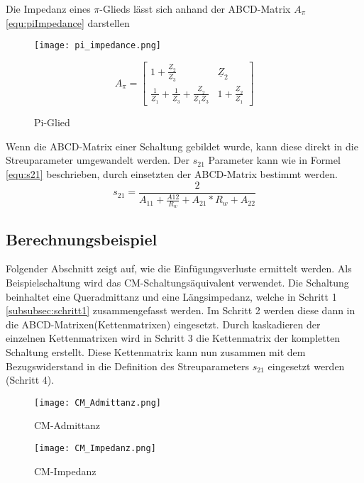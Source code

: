 Die Impedanz eines  $\pi$-Glieds lässt sich anhand der ABCD-Matrix $A_\pi$   \ref{equ:piImpedance} darstellen
\begin{figure}[H]
	\begin{minipage}[h]{0.45\linewidth}
		\centering
		\texttt{[image: pi\_impedance.png]}
		\label{fig:piImpedance}
		\caption{Pi-Glied}
	\end{minipage}
	\begin{minipage}[h]{0.45\linewidth}
		\begin{equation}\label{equ:piImpedance}
			A_\pi = \left[\begin{matrix}
			1+\frac{\underline{Z}_2}{\underline{Z}_3}&\underline{Z}_2\\
			\frac{1}{\underline{Z}_1}+\frac{1}{\underline{Z}_3}+\frac{\underline{Z}_2}{\underline{Z}_1\underline{Z}_3}&1+\frac{\underline{Z}_2}				{\underline{Z}_1}
			\end{matrix}\right]
		\end{equation}
	\end{minipage}
\end{figure}

Wenn die ABCD-Matrix einer Schaltung gebildet wurde, kann diese direkt in die Streuparameter umgewandelt werden. Der $s_{21}$ Parameter kann wie in Formel \ref{equ:s21} beschrieben, durch einsetzten der ABCD-Matrix bestimmt werden.
\begin{equation}\label{equ:s21}
s_{21} = \frac{2}{A_{11}+\frac{A{12}}{R_w}+A_{21}*R_w+A_{22}}
\end{equation}
\newpage

\subsection{Berechnungsbeispiel} \label{subsec:beispiel}
Folgender Abschnitt zeigt auf, wie die Einfügungsverluste ermittelt werden. Als Beispielschaltung wird das CM-Schaltungsäquivalent verwendet. Die Schaltung beinhaltet eine Queradmittanz und eine Längsimpedanz, welche in Schritt 1 \ref{subsubsec:schritt1} zusammengefasst werden. Im Schritt 2 werden diese dann in die ABCD-Matrixen(Kettenmatrixen) eingesetzt. Durch kaskadieren der einzelnen Kettenmatrixen wird in Schritt 3 die Kettenmatrix der kompletten Schaltung erstellt. Diese Kettenmatrix kann nun zusammen mit dem Bezugswiderstand in die Definition des Streuparameters $s_{21}$ eingesetzt werden (Schritt 4).

\begin{figure}[H]
	\begin{minipage}[h]{0.45\linewidth}
		\centering
		\texttt{[image: CM\_Admittanz.png]}
		\label{fig:CM-Admittanz}
		\caption{CM-Admittanz}
	\end{minipage}
	\hfill
	\begin{minipage}[h]{0.45\linewidth}
	\centering
		\texttt{[image: CM\_Impedanz.png]}
		\caption{CM-Impedanz}
		\label{fig:CM-Impedanz}
	\end{minipage}
\end{figure}
